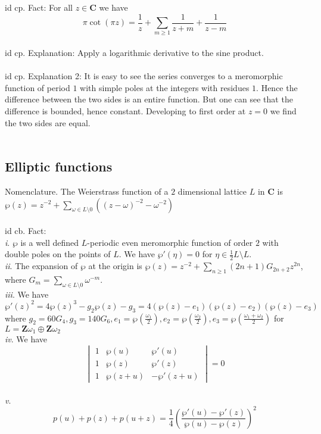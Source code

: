 \documentclass[oneside]{book}
\newcommand{\Z}{\mathbf{Z}}
\newcommand{\C}{\mathbf{C}}
\newcommand{\fit}[1]{\left( #1\right)}
\renewcommand{\i}{{\it i}. }
\newcommand{\ii}{{\it ii}. }
\newcommand{\iii}{{\it iii}. }
\newcommand{\iv}{{\it iv}. }
\renewcommand{\v}{{\it v}. }
\begin{document}
id cp. Fact: For all $z\in\C$ we have $$\pi\cot(\pi z)=\dfrac{1}{z}+\sum_{m\ge 1}\dfrac{1}{z+m}+\dfrac{1}{z-m}$$\\


id cp. Explanation: Apply a logarithmic derivative to the sine product. \\\\


id cp. Explanation 2: It is easy to see the series converges to a meromorphic function of period $1$ with simple poles at the integers with residues $1$. Hence the difference between the two sides is an entire function. But one can see that the difference is bounded, hence constant. Developing to first order at $z=0$ we find the two sides are equal.\\\\


\subsection*{Elliptic functions}


Nomenclature. The Weierstrass function of a $2$ dimensional lattice $L$ in $\C$ is $\wp(z)=z^{-2}+\displaystyle\sum_{\omega\in L\setminus 0}\fit{(z-\omega)^{-2}-\omega^{-2}}$ \\\\


id cb. Fact: \\
\i $\wp$ is a well defined $L$-periodic even meromorphic function of order $2$ with double poles on the points of $L$. We have $\wp'(\eta)=0$ for $\eta\in \frac{1}{2}L \setminus L$.\\
\ii The expansion of $\wp$ at the origin is $\wp(z)=z^{-2}+\sum_{n\ge1}(2n+1)G_{2n+2}z^{2n}$, where $G_{m}=\sum_{\omega\in L\setminus0}\omega^{-m}$. \\
\iii We have $$\wp'(z)^2=4\wp(z)^3-g_2\wp(z)-g_3=4(\wp(z)-e_1)(\wp(z)-e_2)(\wp(z)-e_3)$$ where $g_2=60G_4, g_3=140G_6,  e_1=\wp(\frac{\omega_1}{2}), e_2=\wp(\frac{\omega_2}{2}), e_3=\wp(\frac{\omega_1+\omega_2}{2})$ for $L=\Z \omega_1\oplus \Z\omega_2$ \\
\iv We have $$\begin{vmatrix}
1 & \wp(u) & \wp'(u) \\ 
1 & \wp(z) & \wp'(z) \\ 
1 & \wp(z+u) & -\wp'(z+u)
\end{vmatrix}=0$$ \\
\v $$p(u)+p(z)+p(u+z)=\dfrac{1}{4}\fit{\dfrac{\wp'(u)-\wp'(z)}{\wp(u)-\wp(z)}}^2$$\\
\end{document}
